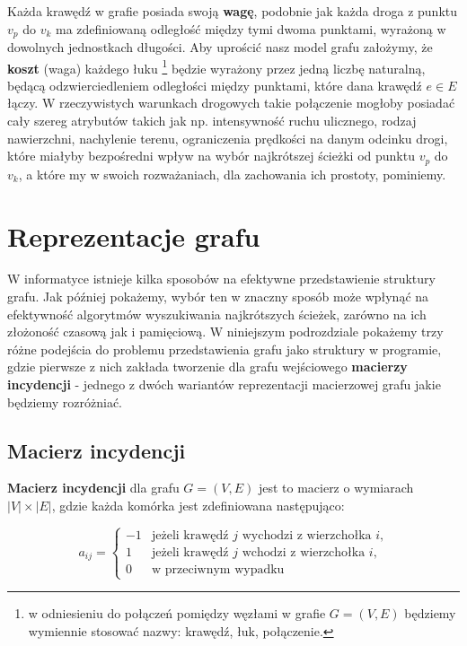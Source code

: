 Każda krawędź w grafie posiada swoją \textbf{wagę}, podobnie jak każda droga z punktu $v_{p}$ do $v_{k}$ ma zdefiniowaną odległość między tymi dwoma punktami, wyrażoną w dowolnych jednostkach długości. Aby uprościć nasz model grafu założymy, że \textbf{koszt} (waga) każdego łuku \footnote{w odniesieniu do połączeń pomiędzy węzłami w grafie $G = \left( V, E \right) $ będziemy wymiennie stosować nazwy: krawędź, łuk, połączenie.} będzie wyrażony przez jedną liczbę naturalną, będącą odzwierciedleniem odległości między punktami, które dana krawędź $e \in E$ łączy. W rzeczywistych warunkach drogowych takie połączenie mogłoby posiadać cały szereg atrybutów takich jak np. intensywność ruchu ulicznego, rodzaj nawierzchni, nachylenie terenu, ograniczenia prędkości na danym odcinku drogi, które miałyby bezpośredni wpływ na wybór najkrótszej ścieżki od punktu $v_{p}$ do $v_{k}$, a które my w swoich rozważaniach, dla zachowania ich prostoty, pominiemy.

\section{Reprezentacje grafu}

W informatyce istnieje kilka sposobów na efektywne przedstawienie struktury grafu. Jak później pokażemy, wybór ten w znaczny sposób może wpłynąć na efektywność algorytmów wyszukiwania najkrótszych ścieżek, zarówno na ich złożoność czasową jak i pamięciową. W niniejszym podrozdziale pokażemy trzy różne podejścia do problemu przedstawienia grafu jako struktury w programie, gdzie pierwsze z nich zakłada tworzenie dla grafu wejściowego \textbf{macierzy incydencji} - jednego z dwóch wariantów reprezentacji macierzowej grafu jakie będziemy rozróżniać.

\subsection{Macierz incydencji}

\textbf{Macierz incydencji} dla grafu $G = \left( V, E \right) $ jest to macierz o wymiarach $\left| V \right| \times \left| E \right|$, gdzie każda komórka jest zdefiniowana następująco:

\begin{equation}
	a_{ij}= \left\{ 
	\begin{array}{ll}
	-1 & \textrm{jeżeli krawędź $j$ wychodzi z wierzchołka $i$,}\\
	1 & \textrm{jeżeli krawędź $j$ wchodzi z wierzchołka $i$,}\\
	0 & \textrm{w przeciwnym wypadku}
	\end{array} \right.
\end{equation}

